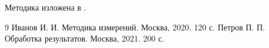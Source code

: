 Методика изложена в \cite{ivanov}.

\begin{thebibliography}{9}
   Иванов И. И. Методика измерений. Москва, 2020. 120 с.
   Петров П. П. Обработка результатов. Москва, 2021. 200 с. %
\end{thebibliography}
